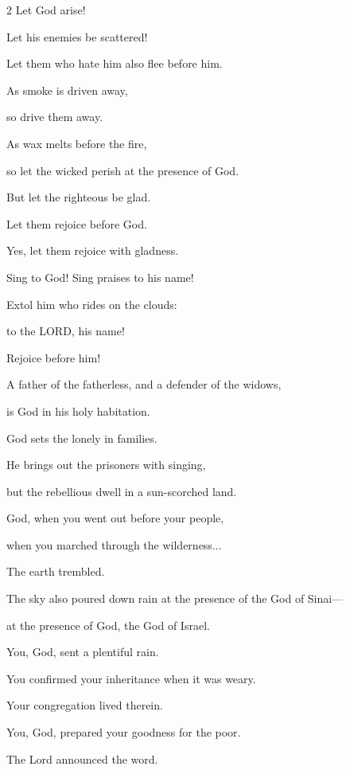 \begin{multicols}{2}
	\myverse*{}Let God arise!
	
	Let his enemies be scattered!
	
	Let them who hate him also flee before him.
	
	
	\myverse{}As smoke is driven away,
	
	so drive them away.
	
	As wax melts before the fire,
	
	so let the wicked perish at the presence of God.
	
	
	\myverse{}But let the righteous be glad.
	
	Let them rejoice before God.
	
	Yes, let them rejoice with gladness.
	
	
	\myverse{}Sing to God! Sing praises to his name!
	
	Extol him who rides on the clouds:
	
	to the LORD, his name!
	
	Rejoice before him!
	
	
	\myverse{}A father of the fatherless, and a defender of the widows,
	
	is God in his holy habitation.
	
	
	\myverse{}God sets the lonely in families.
	
	He brings out the prisoners with singing,
	
	but the rebellious dwell in a sun-scorched land.
	
	\vspace{\baselineskip}	
	
	\myverse{}God, when you went out before your people,
	
	when you marched through the wilderness...
	
	\vspace{\baselineskip}	
	
	\myverse{}The earth trembled.
	
	The sky also poured down rain at the presence of the God of Sinai---
	
	at the presence of God, the God of Israel.
	
	
	\myverse{}You, God, sent a plentiful rain.
	
	You confirmed your inheritance when it was weary.
	
	
	\myverse{}Your congregation lived therein.
	
	You, God, prepared your goodness for the poor.
	
	
	\myverse{}The Lord announced the word.
	

\end{multicols}
